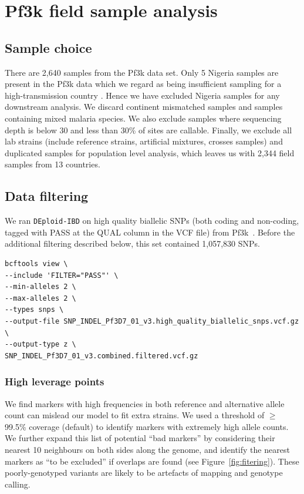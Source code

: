 \documentclass[9pt]{article}
\begin{document}
\newpage

\section{Pf3k field sample analysis}
\subsection{Sample choice}
There are 2,640 samples from the Pf3k data set. Only 5 Nigeria samples are present in the Pf3k data which we regard as being insufficient sampling for a high-transmission country \citep{who2017profileNigeria}. Hence we have excluded Nigeria samples for any downstream analysis. We discard continent mismatched samples and samples containing mixed malaria species. We also exclude samples where sequencing depth is below 30 and less than 30\% of sites are callable. Finally, we exclude all lab strains (include reference strains, artificial mixtures, crosses samples) and duplicated samples for population level analysis, which leaves us with 2,344 field samples from 13 countries.


\subsection{Data filtering}
We ran {\tt DEploid-IBD} on high quality biallelic SNPs (both coding and non-coding, tagged with PASS at the QUAL column in the VCF file) from Pf3k~\citep{pf3k}. Before the additional filtering described below, this set contained 1,057,830 SNPs.
\linespread{1}
\begin{lstlisting}
bcftools view \
--include 'FILTER="PASS"' \
--min-alleles 2 \
--max-alleles 2 \
--types snps \
--output-file SNP_INDEL_Pf3D7_01_v3.high_quality_biallelic_snps.vcf.gz \
--output-type z \
SNP_INDEL_Pf3D7_01_v3.combined.filtered.vcf.gz
\end{lstlisting}

\subsubsection{High leverage points}

We find markers with high frequencies in both reference and alternative allele count can mislead our model to fit extra strains. We used a threshold of $\geq$ 99.5\% coverage (default) to identify markers with extremely high allele counts. We further expand this list of potential ``bad markers'' by considering their nearest 10 neighbours on both sides along the genome, and identify the nearest markers as ``to be excluded'' if overlaps are found (see Figure~\ref{fig:fitering}). These poorly-genotyped variants are likely to be artefacts of mapping and genotype calling.
\end{document}
